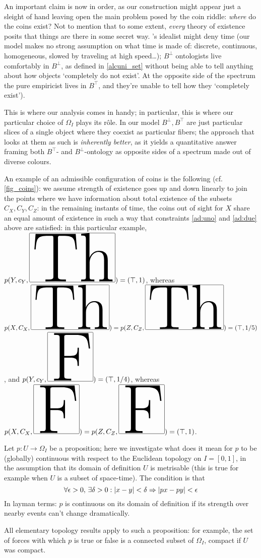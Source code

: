 \begin{remark}
  An important claim is now in order, as our construction might appear just a sleight of hand leaving open the main problem posed by the coin riddle: \emph{where} do the coins exist? Not to mention that to some extent, \emph{every} theory of existence posits that things are there in some secret way. \tlon's idealist might deny time (our model makes no strong assumption on what time is made of: discrete, continuous, homogeneous, slowed by traveling at high speed\dots); $B^\bot$ ontologists live comfortably in $B^\bot$, as defined in \autoref{alcuni_set} without being able to tell anything about how objects `completely do not exist'.
  At the opposite side of the spectrum the pure empiricist lives in $B^\top$, and they're unable to tell how they `completely exist').

  This is where our analysis comes in handy; in particular, this is where our particular choice of $\Omega_I$ plays its r\^ole. In our model $B^\perp, B^\top$ are just particular slices of a single object where they coexist as particular fibers; the approach that looks at them as such is \emph{inherently better}, as it yields a quantitative answer framing both $B^\top$- and $B^\bot$-ontology as opposite sides of a spectrum made out of diverse colours.
\end{remark}
\begin{example}
  An example of an admissible configuration of coins is the following (cf. \autoref{fig_coins}): we assume strength of existence goes up and down linearly to join the points where we have information about total existence of the subsets $C_X,C_Y,C_Z$: in the remaining instants of time, the coins out of sight for $X$ share an equal amount of existence in such a way that constraints \ref{ad:uno} and \ref{ad:due} above are satisfied: in this particular example, $p(Y,c_Y,\Th) = (\top,1)$, whereas $p(X,C_X,\Th)=p(Z,C_Z,\Th)=(\top,1/5)$, and $p(Y,c_Y,\F)=(\top,1/4)$, whereas $p(X,C_X,\F)=p(Z,C_Z,\F)=(\top,1)$.
\end{example}
\begin{remark}\label{continuiti}
  Let $p : U \to \Omega_I$ be a proposition; here we investigate what does it mean for $p$ to be (globally) continuous with respect to the Euclidean topology on $I=[0,1]$, in the assumption that its domain of definition $U$ is metrisable (this is true for example when $U$ is a subset of space-time). The condition is that
  \[ \forall \epsilon > 0,\,\exists \delta > 0 : |x-y|< \delta \Rightarrow |px-py| < \epsilon \]
  In layman terms: $p$ is continuous on its domain of definition if its strength over nearby events can't change dramatically.

  All elementary topology results apply to such a proposition: for example, the set of forces with which $p$ is true or false is a connected subset of $\Omega_I$, compact if $U$ was compact.
\end{remark}
